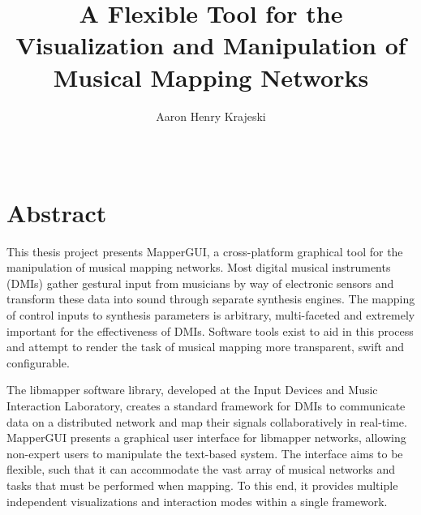 \documentclass [12pt,letterpaper]{report}
\begin{document}

\title{A Flexible Tool for the Visualization and Manipulation of Musical Mapping Networks}
\author{Aaron Henry Krajeski}
\date{\Month\ \number\year}

\maketitle

\raggedbottom
\onehalfspacing
{}

\section*{\centering Abstract}

This thesis project presents MapperGUI, a cross-platform graphical tool for the manipulation of musical mapping networks. Most digital musical instruments (DMIs) gather gestural input from musicians by way of electronic sensors and transform these data into sound through separate synthesis engines. The mapping of control inputs to synthesis parameters is arbitrary, multi-faceted and extremely important for the effectiveness of DMIs. Software tools exist to aid in this process and attempt to render the task of musical mapping more transparent, swift and configurable. 

The libmapper software library, developed at the Input Devices and Music Interaction Laboratory, creates a standard framework for DMIs to communicate data on a distributed network and map their signals collaboratively in real-time. MapperGUI presents a graphical user interface for libmapper networks, allowing non-expert users to manipulate the text-based system. The interface aims to be flexible, such that it can accommodate the vast array of musical networks and tasks that must be performed when mapping. To this end, it provides multiple independent visualizations and interaction modes within a single framework. 
\end{document}
